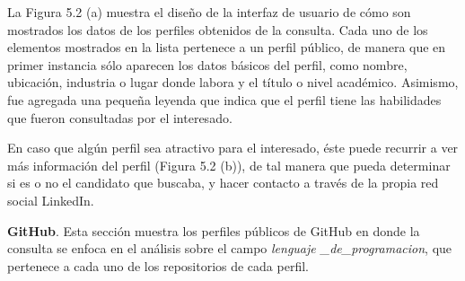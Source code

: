 \begin{figure}[H]
\label{fig:multiRH02}
\end{figure}

La Figura 5.2 (a) muestra el diseño de la interfaz de usuario de cómo son mostrados los datos de los perfiles obtenidos de la consulta. Cada uno de los elementos mostrados en la lista pertenece a un perfil público, de manera que en primer instancia sólo aparecen los datos básicos del perfil, como nombre, ubicación, industria o lugar donde labora y el título o nivel académico. Asimismo, fue agregada una pequeña leyenda que indica que el perfil tiene las habilidades que fueron consultadas por el interesado.

En caso que algún perfil sea atractivo para el interesado, éste puede recurrir a ver más información del perfil (Figura 5.2 (b)), de tal manera que pueda determinar si es o no el candidato que buscaba, y hacer contacto a través de la propia red social LinkedIn.


\textbf{GitHub}.
Esta sección muestra los perfiles públicos de GitHub en donde la consulta se enfoca en el análisis sobre el campo \textit{lenguaje \_de\_programacion}, que pertenece a cada uno de los repositorios de cada perfil. 

